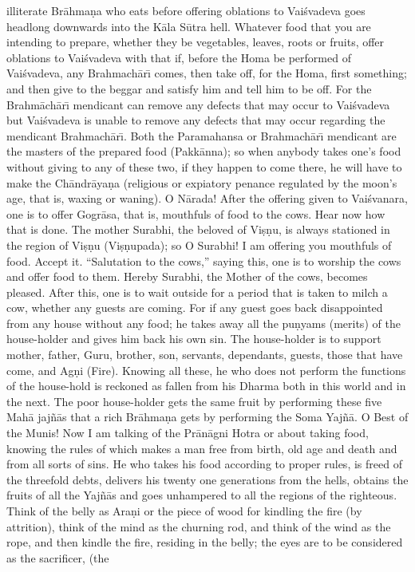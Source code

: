 illiterate Br\=ahma\d{n}a who eats before offering oblations to Vai\'svadeva goes headlong downwards into the K\=ala S\=utra hell. Whatever food that you are intending to prepare, whether they be vegetables, leaves, roots or fruits, offer oblations to Vai\'svadeva with that if, before the Homa be performed of Vai\'svadeva, any Brahmach\=ar\={\i} comes, then take off, for the Homa, first something; and then give to the beggar and satisfy him and tell him to be off. For the Brahm\=ach\=ar\={\i} mendicant can remove any defects that may occur to Vai\'svadeva but Vai\'svadeva is unable to remove any defects that may occur regarding the mendicant Brahmach\=ar\={\i}. Both the Paramahansa or Brahmach\=ar\={\i} mendicant are the masters of the prepared food (Pakk\=anna); so when anybody takes one's food without giving to any of these two, if they happen to come there, he will have to make the Ch\=andr\=aya\d{n}a (religious or expiatory penance regulated by the moon's age, that is, waxing or waning). O N\=arada! After the offering given to Vai\'svanara, one is to offer Gogr\=asa, that is, mouthfuls of food to the cows. Hear now how that is done. The mother Surabhi, the beloved of Vi\d{s}\d{n}u, is always stationed in the region of Vi\d{s}\d{n}u (Vi\d{s}\d{n}upada); so O Surabhi! I am offering you mouthfuls of food. Accept it. ``Salutation to the cows,'' saying this, one is to worship the cows and offer food to them. Hereby Surabhi, the Mother of the cows, becomes pleased. After this, one is to wait outside for a period that is taken to milch a cow, whether any guests are coming. For if any guest goes back disappointed from any house without any food; he takes away all the pu\d{n}yams (merits) of the house-holder and gives him back his own sin. The house-holder is to support mother, father, Guru, brother, son, servants, dependants, guests, those that have come, and Ag\d{n}i (Fire). Knowing all these, he who does not perform the functions of the house-hold is reckoned as fallen from his Dharma both in this world and in the next. The poor house-holder gets the same fruit by performing these five Mah\=a jaj\~n\=as that a rich Br\=ahma\d{n}a gets by performing the Soma Yaj\~n\=a. O Best of the Munis! Now I am talking of the Pr\=an\=agni Hotra or about taking food, knowing the rules of which makes a man free from birth, old age and death and from all sorts of sins. He who takes his food according to proper rules, is freed of the threefold debts, delivers his twenty one generations from the hells, obtains the fruits of all the Yaj\~n\=as and goes unhampered to all the regions of the righteous. Think of the belly as Ara\d{n}i or the piece of wood for kindling the fire
(by attrition), think of the mind as the churning rod, and think of the wind as the rope, and then kindle the fire, residing in the belly; the eyes are to be considered as the sacrificer, (the


